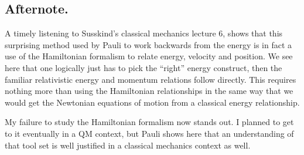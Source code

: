 \subsection{Afternote. }

A timely listening to Susskind's classical mechanics lecture 6, shows that 
this surprising method used by Pauli to work backwards from the energy 
is in fact a use of the Hamiltonian formalism to relate energy, velocity
and position.  We see here that one logically just has to pick the ``right''
energy construct, then the familiar relativistic energy and momentum relations
follow directly.  This requires nothing more than using the Hamiltonian
relationships in the same way that we would get the Newtonian equations
of motion from a classical energy relationship.

My failure to study the Hamiltonian formalism now stands out.  I planned to 
get to it eventually in a QM context, but Pauli shows here that an understanding
of that tool set is well justified in a classical mechanics context as well.

%
%

%
